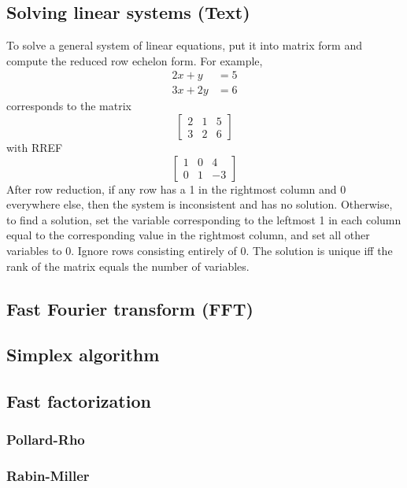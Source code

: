 \documentclass[10pt]{extarticle}
\begin{document}
\begin{multicols*}{3}
\subsection{Solving linear systems (Text)} %
To solve a general system of linear equations, put it into matrix form and
compute the reduced row echelon form. For example,
\begin{align*}2x + y &= 5 \\ 3x + 2y &= 6\end{align*}
corresponds to the matrix
\[ \left[ \begin{array}{cc|c} 2 & 1 & 5 \\ 3 & 2 & 6 \end{array} \right] \]
with RREF
\[ \left[ \begin{array}{cc|c} 1 & 0 & 4 \\ 0 & 1 & -3 \end{array} \right] \]
After row reduction, if any row has a 1 in the rightmost column and 0
everywhere else, then the system is inconsistent and has no solution.
Otherwise, to find a solution, set the variable corresponding to the leftmost 1
in each column equal to the corresponding value in the rightmost column, and
set all other variables to 0. Ignore rows consisting entirely of 0. The
solution is unique iff the rank of the matrix equals the number of variables.

\subsection{Fast Fourier transform (FFT)} %


\subsection{Simplex algorithm} %


\subsection{Fast factorization} %

\subsubsection{Pollard-Rho}


\subsubsection{Rabin-Miller}



\end{multicols*}
\end{document}
